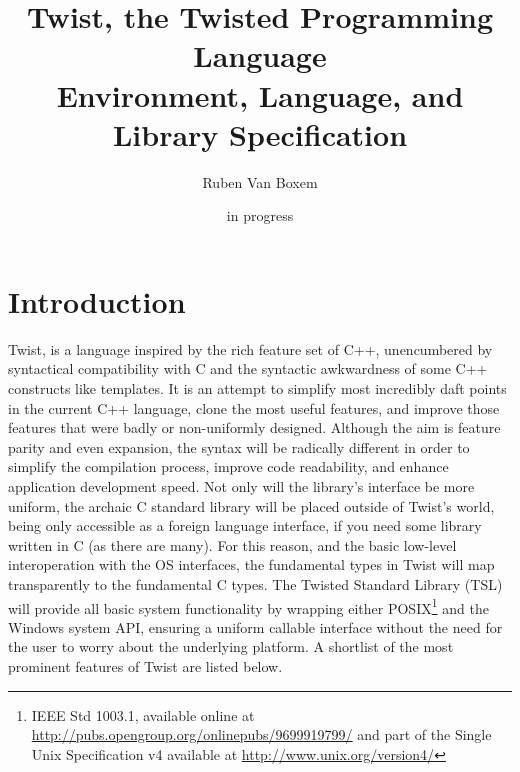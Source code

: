 \documentclass[a4paper,11pt]{report}
\title{Twist, the Twisted Programming Language\\Environment, Language, and Library Specification}
\date{in progress}
\author{Ruben Van Boxem}
\begin{document}
\maketitle

\tableofcontents
\thispagestyle{empty}

\chapter{Introduction}

Twist, is a language inspired by the rich feature set of C++, unencumbered by syntactical compatibility with C and the syntactic awkwardness of some C++ constructs like templates.
It is an attempt to simplify most incredibly daft points in the current C++ language, clone the most useful features, and improve those features that were badly or non-uniformly designed.
Although the aim is feature parity and even expansion, the syntax will be radically different in order to simplify the compilation process, improve code readability, and enhance application development speed.
Not only will the library's interface be more uniform, the archaic C standard library will be placed outside of Twist's world, being only accessible as a foreign language interface, if you need some library written in C (as there are many).
For this reason, and the basic low-level interoperation with the OS interfaces, the fundamental types in Twist will map transparently to the fundamental C types.
The Twisted Standard Library (TSL) will  provide all basic system functionality by wrapping either POSIX\footnote{IEEE Std 1003.1, available online at \url{http://pubs.opengroup.org/onlinepubs/9699919799/} and part of the Single Unix Specification v4 available at \url{http://www.unix.org/version4/}} and the Windows system API, ensuring a uniform callable interface without the need for the user to worry about the underlying platform.
A shortlist of the most prominent features of Twist are listed below.
\end{document}
